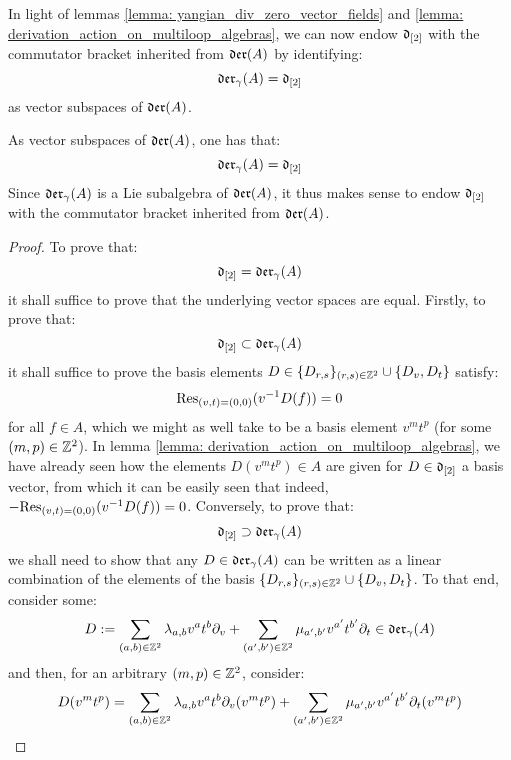         In light of lemmas \ref{lemma: yangian_div_zero_vector_fields} and \ref{lemma: derivation_action_on_multiloop_algebras}, we can now endow $\d_{[2]}$ with the commutator bracket inherited from $\der(A)$ by identifying:
            $$\der_{\gamma}(A) = \d_{[2]}$$
        as vector subspaces of $\der(A)$.
        \begin{proposition} \label{prop: intrinsic_description_of_yangian_div_zero_vector_fields}
            As vector subspaces of $\der(A)$, one has that:
                $$\der_{\gamma}(A) = \d_{[2]}$$
            Since $\der_{\gamma}(A)$ is a Lie subalgebra of $\der(A)$, it thus makes sense to endow $\d_{[2]}$ with the commutator bracket inherited from $\der(A)$.
        \end{proposition}
            \begin{proof}
                To prove that:
                    $$\d_{[2]} = \der_{\gamma}(A)$$
                it shall suffice to prove that the underlying vector spaces are equal. Firstly, to prove that:
                    $$\d_{[2]} \subset \der_{\gamma}(A)$$
                it shall suffice to prove the basis elements $D \in \{D_{r, s}\}_{(r, s) \in \Z^2} \cup \{D_v, D_t\}$ satisfy:
                    $$\Res_{(v, t) = (0, 0)}( v^{-1} D(f) ) = 0$$
                for all $f \in A$, which we might as well take to be a basis element $v^m t^p$ (for some $(m, p) \in \Z^2$). In lemma \ref{lemma: derivation_action_on_multiloop_algebras}, we have already seen how the elements $D(v^m t^p) \in A$ are given for $D \in \d_{[2]}$ a basis vector, from which it can be easily seen that indeed, $-\Res_{(v, t) = (0, 0)}( v^{-1} D(f) ) = 0$. Conversely, to prove that:
                    $$\d_{[2]} \supset \der_{\gamma}(A)$$
                we shall need to show that any $D \in \der_{\gamma}(A)$ can be written as a linear combination of the elements of the basis $\{D_{r, s}\}_{(r, s) \in \Z^2} \cup \{D_v, D_t\}$. To that end, consider some:
                    $$D := \sum_{(a, b) \in \Z^2} \lambda_{a, b} v^a t^b \del_v + \sum_{(a', b') \in \Z^2} \mu_{a', b'} v^{a'} t^{b'} \del_t \in \der_{\gamma}(A)$$
                and then, for an arbitrary $(m, p) \in \Z^2$, consider:
                    $$
                        \begin{aligned}
                            D(v^m t^p) & = \sum_{(a, b) \in \Z^2} \lambda_{a, b} v^a t^b \del_v(v^m t^p) + \sum_{(a', b') \in \Z^2} \mu_{a', b'} v^{a'} t^{b'} \del_t(v^m t^p)
                            \\

\end{aligned}$$
\end{proof}
